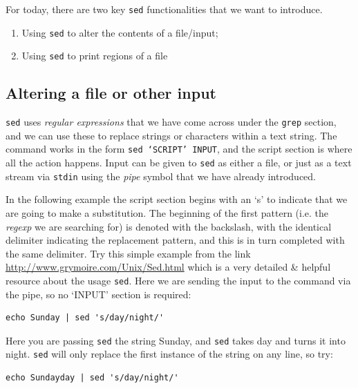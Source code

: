 \documentclass[a4paper,12pt,twoside]{memoir}
\begin{document}
For today, there are two key \texttt{sed} functionalities that we want to introduce.\\
\begin{enumerate}
\item Using \texttt{sed} to alter the contents of a file/input;
\item Using \texttt{sed} to print regions of a file
\end{enumerate}

\subsection*{Altering a file or other input}
\texttt{sed} uses \textit{regular expressions} that we have come across under the \texttt{grep} section, and we can use these to replace strings or characters within a text string.
The command works in the form \texttt{sed `SCRIPT' INPUT}, and the script section is where all the action happens.
Input can be given to \texttt{sed} as either a file, or just as a text stream via \texttt{stdin} using the \textit{pipe} symbol that we have already introduced.

\begin{steps}
In the following example the script section begins with an `s' to indicate that we are going to make a substitution.
The beginning of the first pattern (i.e. the \textit{regexp} we are searching for) is denoted with the backslash, with the identical delimiter indicating the replacement pattern, and this is in turn completed with the same delimiter.
Try this simple example from the link \url{http://www.grymoire.com/Unix/Sed.html} which is a very detailed \& helpful resource about the usage \texttt{sed}.
Here we are sending the input to the command via the pipe, so no `INPUT' section is required: \\
\end{steps}

\begin{lstlisting}
echo Sunday | sed 's/day/night/' 
\end{lstlisting}

Here you are passing \texttt{sed} the string Sunday, and \texttt{sed} takes day and turns it into night.  
\texttt{sed} will only replace the first instance of the string on any line, so try: \\

\begin{lstlisting}
echo Sundayday | sed 's/day/night/' 
\end{lstlisting}
\end{document}
